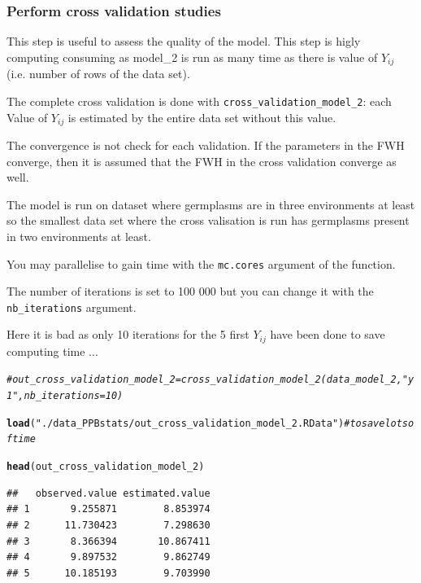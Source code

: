 \documentclass{book}\usepackage[]{graphicx}\usepackage[]{color}
\makeatletter
\newcommand{\hlstr}[1]{\textcolor[rgb]{0.192,0.494,0.8}{#1}}%
\newcommand{\hlcom}[1]{\textcolor[rgb]{0.678,0.584,0.686}{\textit{#1}}}%
\newcommand{\hlstd}[1]{\textcolor[rgb]{0.345,0.345,0.345}{#1}}%
\newcommand{\hlkwd}[1]{\textcolor[rgb]{0.737,0.353,0.396}{\textbf{#1}}}%
\newenvironment{kframe}{%
 \def\at@end@of@kframe{}%
 \ifinner\ifhmode%
  \def\at@end@of@kframe{\end{minipage}}%
  \begin{minipage}{\columnwidth}%
 \fi\fi%
 \def\FrameCommand##1{\hskip\@totalleftmargin \hskip-\fboxsep
 \colorbox{shadecolor}{##1}\hskip-\fboxsep
     \hskip-\linewidth \hskip-\@totalleftmargin \hskip\columnwidth}%
 \MakeFramed {\advance\hsize-\width
   \@totalleftmargin\z@ \linewidth\hsize
   \@setminipage}}%
 {\par\unskip\endMakeFramed%
 \at@end@of@kframe}
\newenvironment{knitrout}{}{} %
\makeatother
\begin{document}
\subsubsection{Perform cross validation studies}

This step is useful to assess the quality of the model.
This step is higly computing consuming as model\_2 is run as many time as there is value of $Y_{ij}$ (i.e. number of rows of the data set).

The complete cross validation is done with \texttt{cross\_validation\_model\_2}: 
each Value of $Y_{ij}$ is estimated by the entire data set without this value.

The convergence is not check for each validation. 
If the parameters in the FWH converge, then it is assumed that the FWH in the cross validation converge as well.

The model is run on dataset where germplasms are in three environments at least so the smallest data set where the cross valisation is run has germplasms present in two environments at least. 

You may parallelise to gain time with the \texttt{mc.cores} argument of the function.

The number of iterations is set to 100 000 but you can change it with the \texttt{nb\_iterations} argument.

Here it is bad as only 10 iterations for the 5 first $Y_{ij}$ have been done to save computing time ...

\begin{knitrout}
\color{fgcolor}\begin{kframe}
\begin{alltt}
\hlcom{# out_cross_validation_model_2 = cross_validation_model_2(data_model_2, "y1", nb_iterations = 10)}

\hlkwd{load}\hlstd{(}\hlstr{"./data_PPBstats/out_cross_validation_model_2.RData"}\hlstd{)} \hlcom{# to save lots of time}

\hlkwd{head}\hlstd{(out_cross_validation_model_2)}
\end{alltt}
\begin{verbatim}
##   observed.value estimated.value
## 1       9.255871        8.853974
## 2      11.730423        7.298630
## 3       8.366394       10.867411
## 4       9.897532        9.862749
## 5      10.185193        9.703990
\end{verbatim}
\end{kframe}
\end{knitrout}
\end{document}
